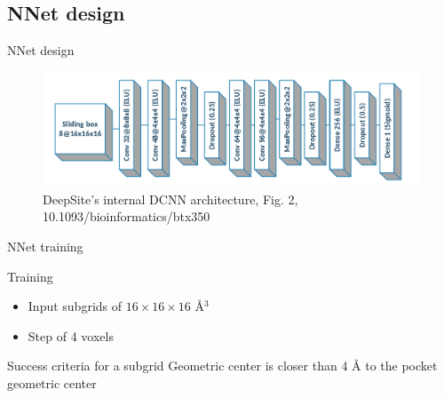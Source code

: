 \documentclass{beamer}
\begin{document}
\subsection{NNet design}

\begin{frame}{NNet design}
  \begin{figure}[h]
    \includegraphics[width=1\textwidth]{deepsite_dcnn_architecture}
    \caption{DeepSite’s internal DCNN architecture, Fig. 2, 10.1093/bioinformatics/btx350}
  \end{figure}
\end{frame}

\begin{frame}{NNet training}
  \begin{block}{Training}
    \begin{itemize}
      \item Input subgrids of $16 \times 16 \times 16$ \AA$^3$
      \item Step of 4 voxels
    \end{itemize}
  \end{block}
  \begin{block}{Success criteria for a subgrid}
    Geometric center is closer than 4 Å to the pocket geometric center
  \end{block}
\end{frame}
\end{document}
